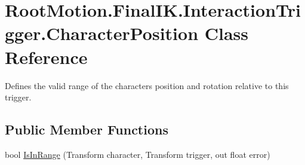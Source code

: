 \hypertarget{class_root_motion_1_1_final_i_k_1_1_interaction_trigger_1_1_character_position}{}\section{Root\+Motion.\+Final\+I\+K.\+Interaction\+Trigger.\+Character\+Position Class Reference}
\label{class_root_motion_1_1_final_i_k_1_1_interaction_trigger_1_1_character_position}


Defines the valid range of the character\textquotesingle{}s position and rotation relative to this trigger.  


\subsection*{Public Member Functions}
\begin{DoxyCompactItemize}
\item 
bool \mbox{\hyperlink{class_root_motion_1_1_final_i_k_1_1_interaction_trigger_1_1_character_position_ae5efb02ac0054e7248fa8945de9d3d11}{Is\+In\+Range}} (Transform character, Transform trigger, out float error)
\end{DoxyCompactItemize}
